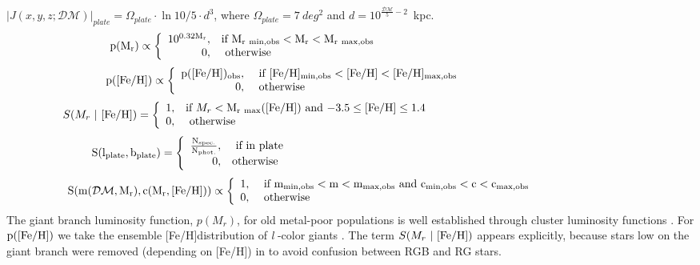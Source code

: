 \documentclass[12pt,preprint]{aastex}
\newcommand{\DM}{\mathcal{DM}}
\newcommand{\feh}{{\rm [Fe/H]}}
\begin{document}
$ |J(x,y,z;\DM)|_{plate} = \Omega_{plate} \cdot \ln10 / 5 \cdot  d^3$,
 where $\Omega_{plate}=7~deg^2$ and $d=10^{\frac{\DM}{5}-2}$~kpc.
\begin{eqnarray}
\rm p(M_r) \propto \left\{ \begin{array}{rl}
\rm 10^{0.32M_r}, &\mbox{\rm if $\rm M_{r~min,obs}<M_r<M_{r~max,obs}$} ~~~~~~~~~~~~~~~~~~~~~~~~~~~~~~~~~~~~~~~~~~~~~~~~~~~~~~~\\
0, &\mbox{ \rm otherwise}~~~~~~~~~~~~~~~~~~~~~~~~~~~~~~~~~~~~~~~~~~~~~~~~~~~~~~~~~~~~~~~~~~~~~~~~~~~~~~~~~~~~
\end{array} \right.\nonumber
\end{eqnarray}
$$
\rm p(\feh) \propto \left\{ \begin{array}{rl}\rm p(\feh)_{obs}, &\mbox{ \rm if $\rm [Fe/H]_{min,obs}<\feh<[Fe/H]_{max,obs}$} ~~~~~~~~~~~~~~~~~~~~~~~~~~~~~~~~~~~\\
0, &\mbox{ \rm otherwise}~~~~~~~~~~~~~~~~~~~~~~~~~~~~~~~~
\end{array} \right.
$$
%
\begin{eqnarray}
S(M_r~|~\feh) = \left\{ \begin{array}{rl}
1, &\mbox{\rm if $M_r < \rm M_{r~max}(\feh)$ and $-3.5\le \feh\le 1.4$} ~~~~~~~~~~~~~~~~~~~~~~~~~~~~~~~~~~~~~~~~~~~~~~~~~~~~~~~\\
0, &\mbox{ \rm otherwise}~~~~~~~~~~~~~~~~~~~~~~~~~~~~~~~~~~~~~~~~~~~~~~~~~~~~~~~~~~~~~~~~~~~~~~~~~~~~~~~~~~~~
\end{array} \right.\nonumber
\end{eqnarray}
$$
\rm S(l_{plate},b_{plate})=\left\{ \begin{array}{rl}
\rm \frac{\rm N_{spec.}}{\rm N_{phot.}}, &\mbox{ \rm if in plate} ~~~~~~~~~~~~~~~~~~~~~~~~~~~~~~~~~~~~~~~~~~~~~~~~~~~~~~~~~~~~~~~~~~~~~~~~~~~~~\\
0, &\mbox{\rm otherwise}~~~~~~~~~~~~~~~~~~~~~~~~~~~~~~~~~~~~~~~~~~~~~~~~~~~~~~~~~~~~~~~~~~~~~~~~~~~~~~~~~~~~~~~
\end{array} \right.
$$
$$
\rm S(m(\DM,M_r),c(M_r,\feh))\propto \left\{ \begin{array}{rl}
1, &\mbox{ \rm if $\rm m_{min,obs}<m<m_{max,obs}$ and $\rm c_{min,obs}<c<c_{max,obs}$} ~~~~~~~~~~~~~~~~~~~~~~~~~~ \\
0, &\mbox{ otherwise}~~~~~~~~~~~~~~~~~~~~~~~~~~~~~~~~~~~~~~~~~~~~~~~~~~~~~
\end{array} \right.
$$
The giant branch luminosity function, $p(M_r)$, for old metal-poor populations is well established through cluster luminosity functions \citep[see][]{Xue2014}. For $\rm p(\feh)$ we take the ensemble \feh distribution of \textit{l} -color giants \citep{Xue2014}. The term $S(M_r~|~\feh)$ appears explicitly, because stars low on the giant branch were removed (depending on \feh ) in \citet{Xue2014} to avoid confusion between RGB and RG stars.
\end{document}
